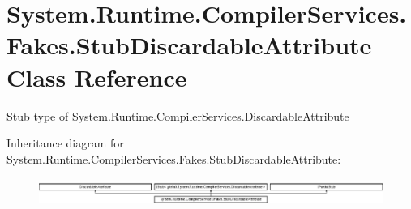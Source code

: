 \hypertarget{class_system_1_1_runtime_1_1_compiler_services_1_1_fakes_1_1_stub_discardable_attribute}{\section{System.\-Runtime.\-Compiler\-Services.\-Fakes.\-Stub\-Discardable\-Attribute Class Reference}
\label{class_system_1_1_runtime_1_1_compiler_services_1_1_fakes_1_1_stub_discardable_attribute}
}


Stub type of System.\-Runtime.\-Compiler\-Services.\-Discardable\-Attribute 


Inheritance diagram for System.\-Runtime.\-Compiler\-Services.\-Fakes.\-Stub\-Discardable\-Attribute\-:\begin{figure}[H]
\begin{center}
\leavevmode
\includegraphics[height=0.886778cm]{class_system_1_1_runtime_1_1_compiler_services_1_1_fakes_1_1_stub_discardable_attribute}
\end{center}
\end{figure}
